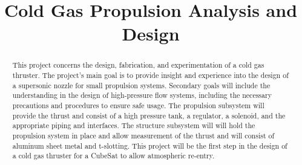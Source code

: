 \documentclass[conference]{IEEEtran} %
\title{Cold Gas Propulsion Analysis and Design}
\author{
  \IEEEauthorblockN{%
    James~Emerson~Parkus\IEEEauthorrefmark{1},  %
    David~Breen\IEEEauthorrefmark{2}
  }
  \IEEEauthorblockA{%
    RIT Space Exploration, Rochester Institute of Technology \\ %
    Rochester, N.Y. \\
    Email:
    \IEEEauthorrefmark{1}jep7631@rit.edu,
    \IEEEauthorrefmark{2}djb1410@rit.edu
}


}
\begin{document}
\maketitle%

\begin{abstract}
  This project concerns the design, fabrication, and experimentation of a cold gas thruster. The project's main goal is to provide insight
  and experience into the design of a supersonic nozzle for small propulsion systems. Secondary goals will include the understanding
  in the design of high-pressure flow systems, including the necessary precautions and procedures to ensure safe usage. The propulsion subsystem
  will provide the thrust and consist of a high pressure tank, a regulator, a solenoid, and the appropriate piping and interfaces. The structure subsystem will
  will hold the propulsion system in place and allow measurement of the thrust and will consist of aluminum sheet metal and t-slotting. This project will be the first
  step in the design of a cold gas thruster for a CubeSat to allow atmospheric re-entry.
\end{abstract}
\end{document}
